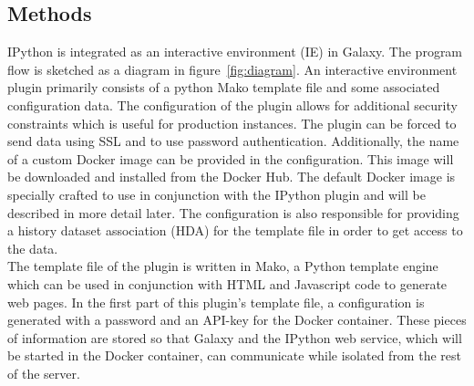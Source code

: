 \documentclass{bioinfo}
\begin{document}
\begin{methods}
\section{Methods}

IPython is integrated as an interactive environment (IE) in Galaxy. The program flow is sketched as a diagram in 
figure~\ref{fig:diagram}. An interactive environment plugin primarily consists of a python Mako template file and some
associated configuration data. The configuration of the plugin allows for additional security constraints which is useful
for production instances. The plugin can be forced to send data using SSL and to use password authentication.
Additionally, the name of a custom Docker image can be provided in the configuration. This image will be downloaded and 
installed from the Docker Hub. The default Docker image is specially crafted to use in conjunction with the IPython plugin
and will be described in more detail later. The configuration is also responsible for providing a history dataset 
association (HDA) for the template file in order to get access to the data. \\
The template file of the plugin is written in Mako, a Python template engine which can be used in conjunction with HTML
and Javascript code to generate web pages. In the first part of this plugin's template file, a configuration is generated with a password
and an API-key for the Docker container. These pieces of information are stored so that Galaxy
and the IPython web service, which will be started in the Docker container, can communicate while isolated from the rest of the server. 


\end{methods}
\end{document}
